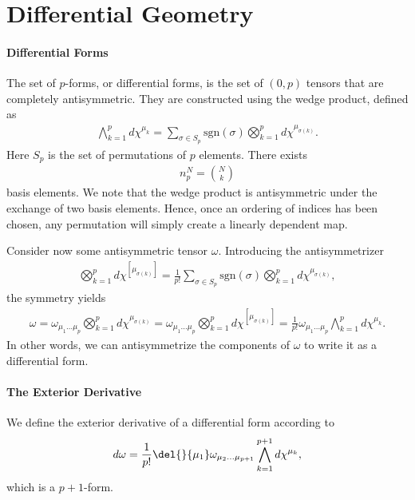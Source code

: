 \section{Differential Geometry}

\paragraph{Differential Forms}
The set of $p$-forms, or differential forms, is the set of $(0, p)$ tensors that are completely antisymmetric. They are constructed using the wedge product, defined as
\begin{align*}
	\bigwedge\limits_{k = 1}^{p}d\chi^{\mu_{k}} = \sum\limits_{\sigma\in S_{p}}\text{sgn}(\sigma)\bigotimes_{k = 1}^{p}d\chi^{\mu_{\sigma(k)}}.
\end{align*}
Here $S_{p}$ is the set of permutations of $p$ elements. There exists
\begin{align*}
	n_{p}^{N} = {N\choose k}
\end{align*}
basis elements. We note that the wedge product is antisymmetric under the exchange of two basis elements. Hence, once an ordering of indices has been chosen, any permutation will simply create a linearly dependent map.

Consider now some antisymmetric tensor $\omega$. Introducing the antisymmetrizer
\begin{align*}
	\bigotimes_{k = 1}^{p}d\chi^{[\mu_{\sigma(k)}]} = \frac{1}{p!}\sum\limits_{\sigma\in S_{p}}\text{sgn}(\sigma)\bigotimes_{k = 1}^{p}d\chi^{\mu_{\sigma(k)}},
\end{align*}
the symmetry yields
\begin{align*}
	\omega = \omega_{\mu_{1}\dots \mu_{p}}\bigotimes_{k = 1}^{p}d\chi^{\mu_{\sigma(k)}} = \omega_{\mu_{1}\dots \mu_{p}}\bigotimes_{k = 1}^{p}d\chi^{[\mu_{\sigma(k)}]} = \frac{1}{p!}\omega_{\mu_{1}\dots \mu_{p}}\bigwedge\limits_{k = 1}^{p}d\chi^{\mu_{k}}.
\end{align*}
In other words, we can antisymmetrize the components of $\omega$ to write it as a differential form.

\paragraph{The Exterior Derivative}
We define the exterior derivative of a differential form according to
\begin{align*}
	d\omega = \frac{1}{p!}\del{}{\mu_{1}}\omega_{\mu_{2}\dots \mu_{p + 1}}\bigwedge\limits_{k = 1}^{p + 1}d\chi^{\mu_{k}},
\end{align*}
which is a $p + 1$-form.

